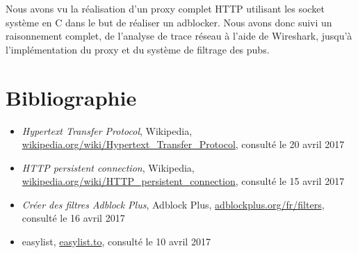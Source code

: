 \documentclass[a4paper,11pt, oneside]{book}
\begin{document}
			 Nous avons vu la réalisation d'un proxy complet HTTP utilisant les socket système en C dans le but de réaliser un adblocker.
			 Nous avons donc suivi un raisonnement complet, de l'analyse de trace réseau à l'aide de Wireshark, jusqu'à l'implémentation
			 du proxy et du système de filtrage des pubs. 


			\chapter{Bibliographie}
			\begin{itemize}
				\item \textit{Hypertext Transfer Protocol}, Wikipedia, \\\href{https://en.wikipedia.org/wiki/Hypertext\_Transfer\_Protocol}
				{wikipedia.org/wiki/Hypertext\_Transfer\_Protocol}, consulté le 20 avril 2017

				\item \textit{HTTP persistent connection}, Wikipedia, \\\href{https://en.wikipedia.org/wiki/HTTP\_persistent\_connection}
				{wikipedia.org/wiki/HTTP\_persistent\_connection}, consulté le 15 avril 2017

				\item \textit{Créer des filtres Adblock Plus}, Adblock Plus, \href{https://adblockplus.org/fr/filters}{adblockplus.org/fr/filters}, consulté le 16 avril 2017
				\item easylist, \href{https://easylist.to/}{easylist.to}, consulté le 10 avril 2017
			\end{itemize}
\end{document}
